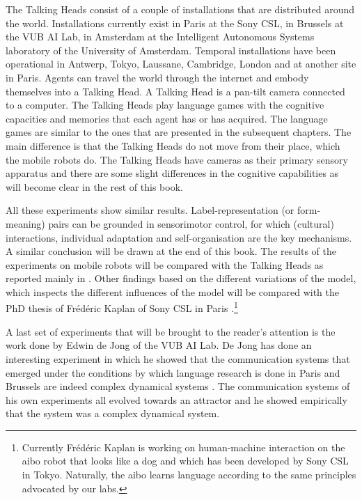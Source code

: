 The Talking Heads consist of a couple of installations that are distributed around the world. Installations currently exist in Paris at the Sony CSL, in Brussels at the VUB AI Lab, in Amsterdam at the Intelligent Autonomous Systems laboratory of the University of Amsterdam. Temporal installations have been operational in Antwerp, Tokyo, Laussane, Cambridge, London and at another site in Paris. Agents can travel the world through the internet and embody themselves into a Talking Head. A Talking Head is a pan-tilt camera connected to a computer. The Talking Heads play language games with the cognitive capacities and memories that each agent has or has acquired. The language games are similar to the ones that are presented in the subsequent chapters. The main difference is that the Talking Heads do not move from their place, which the mobile robots do. The Talking Heads have cameras as their primary sensory apparatus and there are some slight differences in the cognitive capabilities as will become clear in the rest of this book.



All these experiments show similar results. Label-representation (or form-meaning) pairs can be grounded in sensorimotor control, for which (cultural) interactions, individual adaptation and self-organisation are the key mechanisms. A similar conclusion will be drawn at the end of this book. The results of the experiments on mobile robots will be compared with the Talking Heads as reported mainly in \citealt{steels:2000}. Other findings based on the different variations of the model, which inspects the different influences of the model will be compared with the PhD thesis of Fr\'ed\'eric Kaplan of Sony CSL in Paris \citep{kaplan:2000}.\footnote{Currently Fr\'ed\'eric Kaplan is working on human-machine interaction on the {\sc aibo} robot that looks like a dog and which has been developed by Sony CSL in Tokyo. Naturally, the {\sc aibo} learns language according to the same principles advocated by our labs.}


A last set of experiments that will be brought to the reader's attention is the work done by Edwin de Jong of the VUB AI Lab. De Jong has done an interesting experiment in which he showed that the communication systems that emerged under the conditions by which language research is done in Paris and Brussels are indeed complex dynamical systems \citep{dejong:2000}. The communication systems of his own experiments all evolved towards an attractor and he showed empirically that the system was a complex dynamical system.

